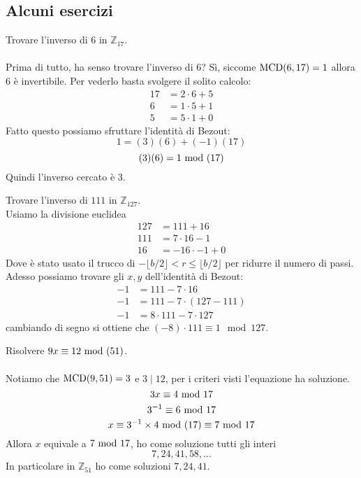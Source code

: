 \subsection{Alcuni esercizi}
\begin{esercizio}
	Trovare l'inverso di 6 in $\mathbb{Z}_{17}$. \\ \\
	Prima di tutto, ha senso trovare l'inverso di 6? Sì, siccome $\operatorname{\mathrm{MCD}}(6,17)=1$ allora 6 è invertibile. Per vederlo basta svolgere il solito calcolo:
	\begin{align*}
	17&=2\cdot6+5\\
	6&=1\cdot5+1\\
	5&=5\cdot1+0
	\end{align*}
	Fatto questo possiamo sfruttare l'identità di Bezout:
	\begin{equation*}
	1=(3)(6)+(-1)(17)
	\end{equation*}
	\begin{equation*}
	(3)(6)=1\ \mathrm{mod}\ (17)
	\end{equation*}
	Quindi l'inverso cercato è 3.
\end{esercizio}
\begin{esercizio}
	Trovare l'inverso di $111$ in $\mathbb{Z}_{127}$. \\
	
	Usiamo la divisione euclidea
	\begin{align*}
		127  &= 111 + 16 \\
		111  &= 7 \cdot 16 - 1 \\
		16   &= -16\cdot -1 + 0
	\end{align*}	
    Dove è stato usato il trucco di $-\lfloor b/2\rfloor < r \le\lfloor{b/2}\rfloor$ per ridurre il numero di passi. Adesso possiamo trovare gli $x,y$ dell'identità di Bezout:
    \begin{align*}
    	-1 &= 111 - 7 \cdot 16 \\
    	-1 &= 111 - 7 \cdot (127 - 111) \\
    	-1 &= 8 \cdot 111 - 7 \cdot 127 
    \end{align*}
	cambiando di segno si ottiene che $(-8) \cdot 111\equiv 1 \mod 127$.
\end{esercizio}
\begin{esercizio}
	Risolvere $9x\equiv12\ \mathrm{mod}\ (51)$.\\ \\
	Notiamo che $\operatorname{\mathrm{MCD}}(9,51)=3$ e $3\mid12$, per i criteri visti l'equazione ha soluzione. 
	\begin{equation*}
	3x\equiv4\ \mathrm{mod}\ 17
	\end{equation*}
	\begin{equation*}
	3^{-1}\equiv6\ \mathrm{mod}\ 17
	\end{equation*}
	\begin{equation*}
	x\equiv3^{-1}\times4\ \mathrm{mod}\ (17)\equiv7\ \mathrm{mod}\ 17
	\end{equation*}
	Allora $x$ equivale a $7\ \mathrm{mod}\ 17$, ho come soluzione tutti gli interi
	\begin{equation*}
	7,24,41,58,\dots
	\end{equation*}
	In particolare in $\mathbb{Z}_{51}$ ho come soluzioni $7,24,41$.
\end{esercizio}
